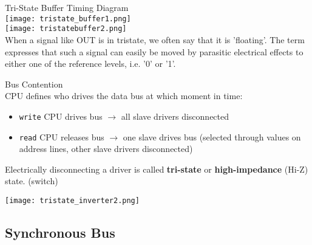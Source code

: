 \begin{concept}{Tri-State Buffer} Timing Diagram\\
    \texttt{[image: tristate\_buffer1.png]}\\
    \texttt{[image: tristatebuffer2.png]}\\
    When a signal like OUT is in tristate, we often say that it is 'floating'. 
    The term expresses that such a signal can easily be moved by parasitic electrical effects
    to either one of the reference levels, i.e. '0' or '1'.
\end{concept}

\begin{KR}{Bus Contention} \\
    CPU defines who drives the data bus at which moment in time:
    \begin{itemize}
        \item \texttt{write} CPU drives bus $\rightarrow$ all slave drivers disconnected
        \item \texttt{read} CPU releases bus $\rightarrow$ one slave drives bus (selected through values on address lines, other slave drivers disconnected)
    \end{itemize}
    
    Electrically disconnecting a driver is called \textbf{tri-state} or \textbf{high-impedance} (Hi-Z) state. (switch)
    
    \texttt{[image: tristate\_inverter2.png]}\\
\end{KR}



\multend

\subsection{Synchronous Bus}


